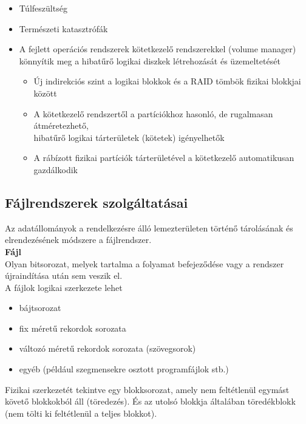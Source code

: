 \documentclass[tikz,12pt,margin=0px]{article}
\begin{document}
\begin{itemize}[topsep=8pt,itemsep=4pt,partopsep=4pt, parsep=4pt]
        \item Túlfeszültség
        \item Természeti katasztrófák
        \item A fejlett operációs rendszerek kötetkezelő rendszerekkel (volume manager) könnyítik meg a hibatűrő logikai diszkek létrehozását és üzemeltetését
        \begin{itemize}
            \item Új indirekciós szint a logikai blokkok és a RAID tömbök fizikai blokkjai között
            \item A kötetkezelő rendszertől a partíciókhoz hasonló, de rugalmasan átméretezhető, \\
            hibatűrő logikai tárterületek (kötetek) igényelhetők
            \item A rábízott fizikai partíciók tárterületével a kötetkezelő automatikusan gazdálkodik
        \end{itemize}
    \end{itemize}
	
	\subsection*{Fájlrendszerek szolgáltatásai}
	
    \noindent Az adatállományok a rendelkezésre álló lemezterületen történő tárolásának és elrendezésének módszere a fájlrendszer.\\

    \noindent \textbf{Fájl}\\

    \noindent Olyan bitsorozat, melyek tartalma a folyamat befejeződése vagy a rendszer újraindítása után sem veszik el. \\
	\noindent A fájlok logikai szerkezete lehet

	\begin{itemize}[topsep=8pt,itemsep=4pt,partopsep=4pt, parsep=4pt]
		\item bájtsorozat
		\item fix méretű rekordok sorozata
		\item változó méretű rekordok sorozata (szövegsorok)
        \item egyéb (például szegmensekre osztott programfájlok stb.)
	\end{itemize}

    \noindent Fizikai szerkezetét tekintve egy blokksorozat, amely nem feltétlenül egymást követő blokkokból áll (töredezés). És az utolsó blokkja általában töredékblokk (nem tölti ki feltétlenül a teljes blokkot).
\end{document}
